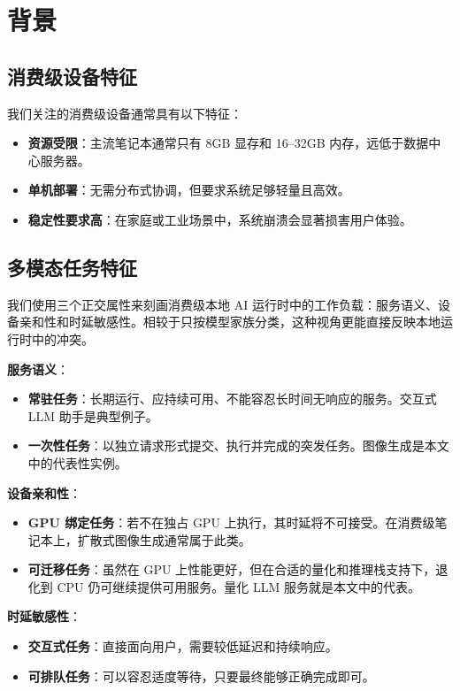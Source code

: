 \section{背景}

\subsection{消费级设备特征}

我们关注的消费级设备通常具有以下特征：
\begin{itemize}
\item \textbf{资源受限}：主流笔记本通常只有 8GB 显存和 16--32GB 内存，远低于数据中心服务器。
\item \textbf{单机部署}：无需分布式协调，但要求系统足够轻量且高效。
\item \textbf{稳定性要求高}：在家庭或工业场景中，系统崩溃会显著损害用户体验。
\end{itemize}

\subsection{多模态任务特征}

我们使用三个正交属性来刻画消费级本地 AI 运行时中的工作负载：服务语义、设备亲和性和时延敏感性。相较于只按模型家族分类，这种视角更能直接反映本地运行时中的冲突。

\textbf{服务语义}：
\begin{itemize}
\item \textbf{常驻任务}：长期运行、应持续可用、不能容忍长时间无响应的服务。交互式 LLM 助手是典型例子。
\item \textbf{一次性任务}：以独立请求形式提交、执行并完成的突发任务。图像生成是本文中的代表性实例。
\end{itemize}

\textbf{设备亲和性}：
\begin{itemize}
\item \textbf{GPU 绑定任务}：若不在独占 GPU 上执行，其时延将不可接受。在消费级笔记本上，扩散式图像生成通常属于此类。
\item \textbf{可迁移任务}：虽然在 GPU 上性能更好，但在合适的量化和推理栈支持下，退化到 CPU 仍可继续提供可用服务。量化 LLM 服务就是本文中的代表。
\end{itemize}

\textbf{时延敏感性}：
\begin{itemize}
\item \textbf{交互式任务}：直接面向用户，需要较低延迟和持续响应。
\item \textbf{可排队任务}：可以容忍适度等待，只要最终能够正确完成即可。
\end{itemize}

